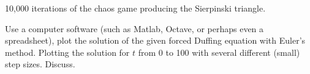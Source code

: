 \documentclass{ximera}
\begin{document}
\begin{myfig}
    \capstart
    \caption{10,000 iterations of the chaos game producing the Sierpinski triangle. \label{nlin:sierpinski}}
\end{myfig}


\begin{exercise}%
    Use a computer software (such as Matlab, Octave, or perhaps even a spreadsheet), plot the solution of the given forced Duffing equation with Euler's method.  Plotting the solution for $t$ from 0 to 100 with several different (small) step sizes. Discuss.
\end{exercise}
\end{document}
